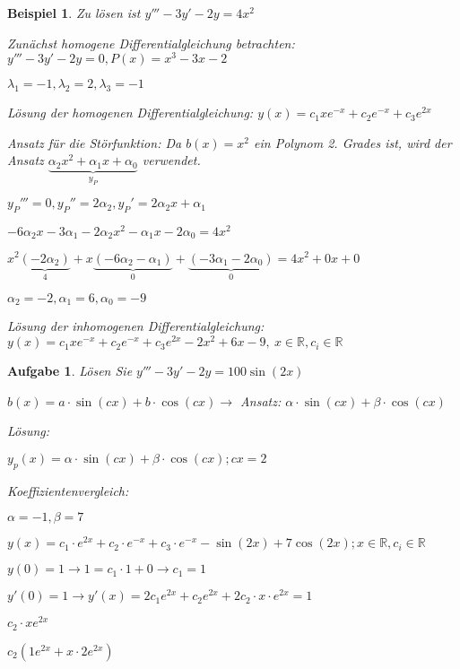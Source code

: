 \documentclass[fontset=ubuntu,12pt,a4paper]{scrreprt}
\newtheorem{beispiel}[defi]{Beispiel}
\newtheorem{aufg}[defi]{Aufgabe}
\begin{document}
     \begin{beispiel}
        Zu lösen ist \(y'''-3y'-2y=4x^2\)

        Zunächst homogene Differentialgleichung betrachten: \(y'''-3y'-2y=0,P(x)=x^3-3x-2\)

        \(\lambda_1=-1,\lambda_2=2,\lambda_3=-1\)

        Lösung der homogenen Differentialgleichung: \(y(x)=c_1xe^{-x}+c_2e^{-x}+c_3e^{2x}\)

        Ansatz für die Störfunktion: Da \(b(x)=x^2\) ein Polynom 2. Grades ist, wird der Ansatz \(\underbrace{\alpha_2x^2+\alpha_1x+\alpha_0}_{y_P}\) verwendet.

        \({y_P}'''=0,{y_P}''=2\alpha_2,{y_P}'=2\alpha_2x+\alpha_1\)

        \(-6\alpha_2x-3\alpha_1-2\alpha_2x^2-\alpha_1x-2\alpha_0=4x^2\)

        \(x^2\underbrace{(-2\alpha_2)}_4+x\underbrace{(-6\alpha_2-\alpha_1)}_0+\underbrace{(-3\alpha_1-2\alpha_0)}_0=4x^2+0x+0\)

        \(\alpha_2=-2,\alpha_1=6,\alpha_0=-9\)

        Lösung der inhomogenen Differentialgleichung: \(y(x)=c_1xe^{-x}+c_2e^{-x}+c_3e^{2x}-2x^2+6x-9,\ x\in\mathbb{R},c_i\in\mathbb{R}\)
     \end{beispiel}

     \begin{aufg}
        Lösen Sie \(y'''-3y'-2y=100\sin(2x)\)

        \(b(x)=a \cdot \sin(cx) + b \cdot \cos(cx) \to\) Ansatz: \(\alpha \cdot \sin(cx) + \beta \cdot \cos(cx)\)

        Lösung:

        \( y_p(x)=\alpha \cdot \sin(cx)+\beta \cdot \cos(cx); cx=2 \)
        
        Koeffizientenvergleich:

        \(\alpha=-1, \beta=7\)

        \(y(x)=c_1 \cdot e^{2x} + c_2 \cdot e^{-x} + c_3 \cdot e^{-x} - \sin(2x) + 7\cos(2x); x \in \mathbb{R}, c_i \in \mathbb{R} \)

        \(y(0)=1 \to 1=c_1\cdot1+0 \to c_1=1 \)

        \( y'(0)=1 \to y'(x)=2c_1e^{2x}+c_2e^{2x}+2c_2\cdot x \cdot e^{2x} = 1 \)

        \(c_2\cdot xe^{2x}\)

        \(c_2(1e^{2x}+x\cdot 2e^{2x})\)
     \end{aufg}
\end{document}
